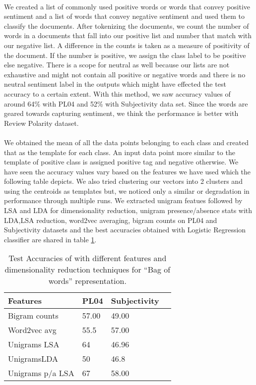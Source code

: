 \documentclass[a4paper,26pt]{article}
\begin{document}
\paragraph{}
We created a list of commonly used positive words or words that convey positive sentiment and a list of words that convey negative sentiment and used them to classify the documents. After tokenizing the documents, we count the number of words in a documents that fall into our positive list and number that match with our negative list. A difference in the counts is taken as a measure of positivity of the document. If the number is positive, we assign the class label to be positive else negative. There is a scope for neutral as well because our lists are not exhaustive and might not contain all positive or negative words and there is no neutral sentiment label in the outputs which might have effected the test accuracy to a certain extent. With this method, we saw accuracy values of around 64\% with PL04 and 52\% with Subjectivity data set. Since the words are geared towards capturing sentiment, we think the performance is better with Review Polarity dataset.

\paragraph{}
We obtained the mean of all the data points belonging to each class and created that as the template for each class. An input data point more similar to the template of positive class is assigned positive tag and negative otherwise. We have seen the accuracy values vary based on the features we have used which the following table depicts. We also tried clustering our vectors into 2 clusters and using the centroids as templates but, we noticed only a similar or degradation in performance through multiple runs. We extracted unigram featues followed by LSA and LDA for dimensionality reduction, unigram presence/absence stats with LDA,LSA reduction, word2vec averaging, bigram counts on PL04 and Subjectivity datasets and the best accuracies obtained with Logistic Regression classifier are shared in table \ref{tab:lr}.

\begin{table}[H]
\centering
\begin{tabular}{ | l | p{1.5cm} | p{2.5cm} | p{2.5cm} |  }
 \hline
 \textbf{Features} & \textbf{PL04} & \textbf{Subjectivity} \\
 \hline
 Bigram counts   & 57.00 &  49.00 \\
 Word2vec avg  & 55.5 & 57.00  \\
 Unigrams LSA &  64 & 46.96 \\
 UnigramsLDA & 50 & 46.8\\  
 Unigrams p/a LSA & 67 & 58.00\\
 \hline
\end{tabular}
\caption{Test Accuracies of with different features and dimensionality reduction techniques for ``Bag of words'' representation.}
\label{tab:lr}
\end{table}
\end{document}
